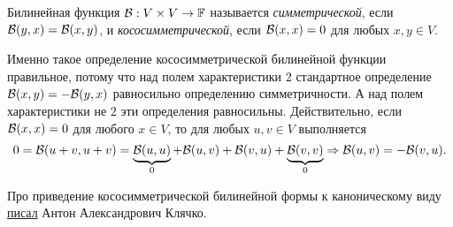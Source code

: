 \begin{definition}
    Билинейная функция $\mathcal{B}: V \times V \to \mathbb{F}$ называется \textit{симметрической}, если $\mathcal{B}(y, x) = \mathcal{B}(x, y)$, и \textit{кососимметрической}, если $\mathcal{B}(x, x) = 0$ для любых $x, y \in V$.
\end{definition}

\begin{remark}
    Именно такое определение кососимметрической билинейной функции правильное, потому что над полем характеристики $2$ стандартное определение $\mathcal{B}(x, y) = -\mathcal{B}(y, x)$ равносильно определению симметричности. А над полем характеристики не $2$ эти определения равносильны. Действительно, если $\mathcal{B}(x, x) = 0$ для любого $x \in V$, то для любых $u, v \in V$ выполняется
    \[
        0 = \mathcal{B}(u + v, u + v) = \underbrace{\mathcal{B}(u, u)}_{0} + \mathcal{B}(u, v) + \mathcal{B}(v, u) + \underbrace{\mathcal{B}(v, v)}_{0} \Rightarrow \mathcal{B}(u, v) = -\mathcal{B}(v, u).
    \]
\end{remark}

Про приведение кососимметрической билинейной формы к каноническому виду \href{http://halgebra.math.msu.su/staff/klyachko/teaching/lin.al/SQ.PDF}{писал} Антон Александрович Клячко.

